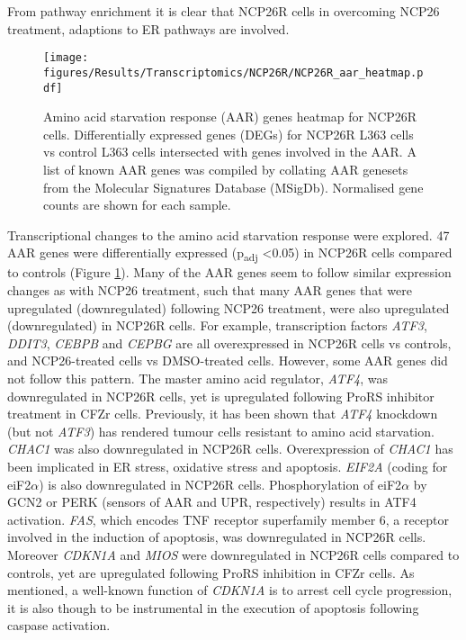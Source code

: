 From pathway enrichment it is clear that NCP26R cells in overcoming NCP26 treatment, adaptions to ER pathways are involved.
\begin{figure}[p]
\centering
\texttt{[image: figures/Results/Transcriptomics/NCP26R/NCP26R\_aar\_heatmap.pdf]}
\caption[Amino acid starvation response genes heatmap- NCP26R cells]{Amino acid starvation response (AAR) genes heatmap for NCP26R cells.
Differentially expressed genes (DEGs) for NCP26R L363 cells vs control L363 cells intersected with genes involved in the AAR.
A list of known AAR genes was compiled by collating AAR genesets from the Molecular Signatures Database (MSigDb).
Normalised gene counts are shown for each sample.
}
\label{fig:ncp26R_aar_heatmap}
\end{figure}
Transcriptional changes to the amino acid starvation response were explored.
47 AAR genes were differentially expressed (p\textsubscript{adj} <0.05) in NCP26R cells compared to controls (Figure \ref{fig:ncp26R_aar_heatmap}).
Many of the AAR genes seem to follow similar expression changes as with NCP26 treatment, such that many AAR genes that were upregulated (downregulated) following NCP26 treatment, were also upregulated (downregulated) in NCP26R cells.
For example, transcription factors \textit{ATF3}, \textit{DDIT3}, \textit{CEBPB} and \textit{CEPBG} are all overexpressed in NCP26R cells vs controls, and NCP26-treated cells vs DMSO-treated cells.
However, some AAR genes did not follow this pattern.
The master amino acid regulator, \textit{ATF4}, was downregulated in NCP26R cells, yet is upregulated following ProRS inhibitor treatment in CFZr cells.
Previously, it has been shown that \textit{ATF4} knockdown (but not \textit{ATF3}) has rendered tumour cells resistant to amino acid starvation\cite{cheng2018arginine}.
\textit{CHAC1} was also downregulated in NCP26R cells.
Overexpression of \textit{CHAC1} has been implicated in ER stress, oxidative stress and apoptosis\cite{crawford2015human}.
\textit{EIF2A} (coding for eiF2$\alpha$) is also downregulated in NCP26R cells.
Phosphorylation of eiF2$\alpha$ by GCN2 or PERK (sensors of AAR and UPR, respectively) results in ATF4 activation.
\textit{FAS}, which encodes TNF receptor superfamily member 6, a receptor involved in the induction of apoptosis, was downregulated in NCP26R cells.
Moreover \textit{CDKN1A} and \textit{MIOS} were downregulated in NCP26R cells compared to controls, yet are upregulated following ProRS inhibition in CFZr cells.
As mentioned, a well-known function of \textit{CDKN1A} is to arrest cell cycle progression, it is also though to be instrumental in the execution of apoptosis following caspase activation.

